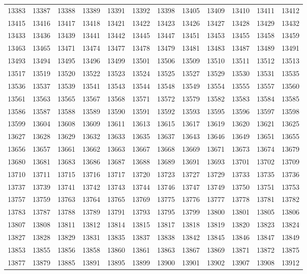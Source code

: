 \begin{center}
\begin{longtable}{llllllllllll}
13383 &13387 &13388 &13389 &13391 &13392 &13398 &13405 &13409 &13410 &13411 &13412 \\
13415 &13416 &13417 &13418 &13421 &13422 &13423 &13426 &13427 &13428 &13429 &13432 \\
13433 &13436 &13439 &13441 &13442 &13445 &13447 &13451 &13453 &13455 &13458 &13459 \\
13463 &13465 &13471 &13474 &13477 &13478 &13479 &13481 &13483 &13487 &13489 &13491 \\
13493 &13494 &13495 &13496 &13499 &13501 &13506 &13509 &13510 &13511 &13512 &13513 \\
13517 &13519 &13520 &13522 &13523 &13524 &13525 &13527 &13529 &13530 &13531 &13535 \\
13536 &13537 &13539 &13541 &13543 &13544 &13548 &13549 &13554 &13555 &13557 &13560 \\
13561 &13563 &13565 &13567 &13568 &13571 &13572 &13579 &13582 &13583 &13584 &13585 \\
13586 &13587 &13588 &13589 &13590 &13591 &13592 &13593 &13595 &13596 &13597 &13598 \\
13599 &13604 &13608 &13609 &13611 &13613 &13615 &13617 &13619 &13620 &13621 &13625 \\
13627 &13628 &13629 &13632 &13633 &13635 &13637 &13643 &13646 &13649 &13651 &13655 \\
13656 &13657 &13661 &13662 &13663 &13667 &13668 &13669 &13671 &13673 &13674 &13679 \\
13680 &13681 &13683 &13686 &13687 &13688 &13689 &13691 &13693 &13701 &13702 &13709 \\
13710 &13711 &13715 &13716 &13717 &13720 &13723 &13727 &13729 &13733 &13735 &13736 \\
13737 &13739 &13741 &13742 &13743 &13744 &13746 &13747 &13749 &13750 &13751 &13753 \\
13757 &13759 &13763 &13764 &13765 &13769 &13775 &13776 &13777 &13778 &13781 &13782 \\
13783 &13787 &13788 &13789 &13791 &13793 &13795 &13799 &13800 &13801 &13805 &13806 \\
13807 &13808 &13811 &13812 &13814 &13815 &13817 &13818 &13819 &13820 &13823 &13824 \\
13827 &13828 &13829 &13831 &13835 &13837 &13838 &13842 &13845 &13846 &13847 &13849 \\
13853 &13855 &13856 &13858 &13860 &13861 &13863 &13867 &13869 &13871 &13872 &13875 \\
13877 &13879 &13885 &13891 &13895 &13899 &13900 &13901 &13902 &13907 &13908 &13912 \\

\end{longtable}
\end{center}
